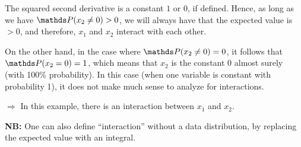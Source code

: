 {The squared second derivative is a constant \(1\) or \(0\), if defined. Hence, as long as we have \(\P(x_2 \neq 0) > 0\), we will always have that the expected value is \(> 0\), and therefore, $x_1$ and $x_2$ interact with each other.

On the other hand, in the case where \(\P(x_2 \neq 0) = 0\), it follows that \(\P(x_2 = 0) = 1\), which means that $x_2$ is the constant 0 almost surely (with 100\% probability).
In this case (when one variable is constant with probability 1), it does not make much sense to analyze for interactions.

$\Rightarrow$ In this example, there is an interaction between $x_1$ and $x_2$.

\textbf{NB:}
One can also define ``interaction'' without a data distribution, by replacing the expected value with an integral.

}

\dlz

